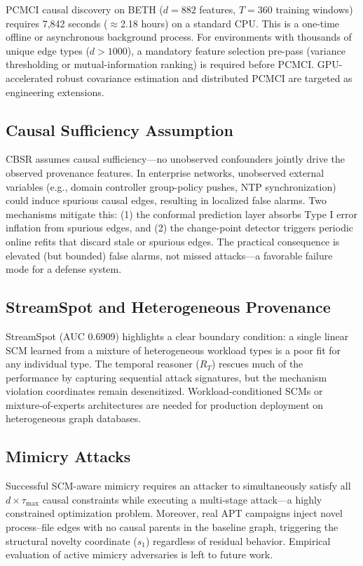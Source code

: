 PCMCI causal discovery on BETH ($d = 882$ features, $T = 360$ training windows) requires
7,842 seconds ($\approx$2.18 hours) on a standard CPU. This is a one-time offline or
asynchronous background process. For environments with thousands of unique edge types ($d > 1000$),
a mandatory feature selection pre-pass (variance thresholding or mutual-information ranking) is
required before PCMCI. GPU-accelerated robust covariance estimation and distributed PCMCI
are targeted as engineering extensions.

\subsection{Causal Sufficiency Assumption}

CBSR assumes causal sufficiency---no unobserved confounders jointly drive the observed provenance
features. In enterprise networks, unobserved external variables (e.g., domain controller
group-policy pushes, NTP synchronization) could induce spurious causal edges, resulting in
localized false alarms. Two mechanisms mitigate this: (1) the conformal prediction layer absorbs
Type I error inflation from spurious edges, and (2) the change-point detector triggers periodic
online refits that discard stale or spurious edges. The practical consequence is elevated (but
bounded) false alarms, not missed attacks---a favorable failure mode for a defense system.

\subsection{StreamSpot and Heterogeneous Provenance}

StreamSpot (AUC 0.6909) highlights a clear boundary condition: a single linear SCM learned from
a mixture of heterogeneous workload types is a poor fit for any individual type. The temporal
reasoner ($R_T$) rescues much of the performance by capturing sequential attack signatures, but
the mechanism violation coordinates remain desensitized. Workload-conditioned SCMs or
mixture-of-experts architectures are needed for production deployment on heterogeneous graph
databases.

\subsection{Mimicry Attacks}

Successful SCM-aware mimicry requires an attacker to simultaneously satisfy all $d \times
\tau_{\max}$ causal constraints while executing a multi-stage attack---a highly constrained
optimization problem. Moreover, real APT campaigns inject novel process--file edges with no
causal parents in the baseline graph, triggering the structural novelty coordinate ($s_1$)
regardless of residual behavior. Empirical evaluation of active mimicry adversaries is left to
future work.


